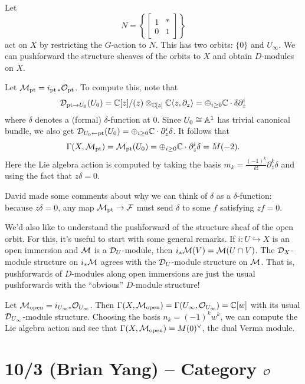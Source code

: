 \documentclass{article}
\begin{document}
\begin{ex}
	Let
	\[
		N = \left\{ \begin{bmatrix}1 & *\\ 0 & 1\end{bmatrix}\right\}
	\]
	act on $X$ by restricting the $G$-action to $N$.
	This has two orbits: $\{0 \}$ and $U_\infty$.
	We can pushforward the structure sheaves of the orbits to $X$ and obtain $D$-modules on $X$.

	Let $\Mc_{\pt} = i_{\pt *} \Oc_{\pt}$.
	To compute this, note that 
	\[
		\Dc_{\pt \to U_0}(U_0) = \CC[z] / (z) \otimes_{\CC[z]} \CC\langle z, \partial_z\rangle = \oplus_{i \geq 0} \CC \cdot \delta \partial_z^i
	\]
	where $\delta$ denotes a (formal) $\delta$-function at $0$.
	Since $U_0 \cong \AA^1$ has trivial canonical bundle, we also get $\Dc_{U_0 \leftarrow \pt}(U_0) = \oplus_{i \geq 0} \CC \cdot \partial_z^i \delta$.
	It follows that
	\[
		\Gamma(X, \Mc_{\pt}) = \Mc_{\pt}(U_0) = \oplus_{i \geq 0} \CC \cdot \partial_z^i \delta = M(-2).
	\]
	Here the Lie algebra action is computed by taking the basis $m_k = \frac{(-1)^k}{k!} \partial_z^k \delta$ and using the fact that $z \delta = 0$.

	David made some comments about why we can think of $\delta$ as a $\delta$-function: because $z \delta = 0$, any map $\Mc_{\pt} \to \Fc$ must send $\delta$ to some $f$ satisfying $zf = 0$.
\end{ex}
	
We'd also like to understand the pushforward of the structure sheaf of the open orbit.
For this, it's useful to start with some general remarks.
If $i: U \hookrightarrow X$ is an open immersion and $\Mc$ is a $\Dc_U$-module, then $i_* \Mc(V) = \Mc(U \cap V)$.
The $\Dc_X$-module structure on $i_* \Mc$ agrees with the $\Dc_U$-module structure on $\Mc$.
That is, pushforwards of $D$-modules along open immersions are just the usual pushforwards with the ``obvious'' $D$-module structure!

\begin{ex}
	Let $\Mc_{\mathrm{open}} = i_{U_\infty *} \Oc_{U_\infty}$.
	Then $\Gamma(X, \Mc_{\mathrm{open}}) = \Gamma(U_\infty, \Oc_{U_\infty}) = \CC[w]$ with its usual $\Dc_{U_\infty}$-module structure.
	Choosing the basis $n_k = (-1)^k w^k$, we can compute the Lie algebra action and see that $\Gamma(X, \Mc_{\mathrm{open}}) = M(0)^\vee$, the dual Verma module.
\end{ex}

\section{10/3 (Brian Yang) -- Category $\Oc$}
\end{document}
